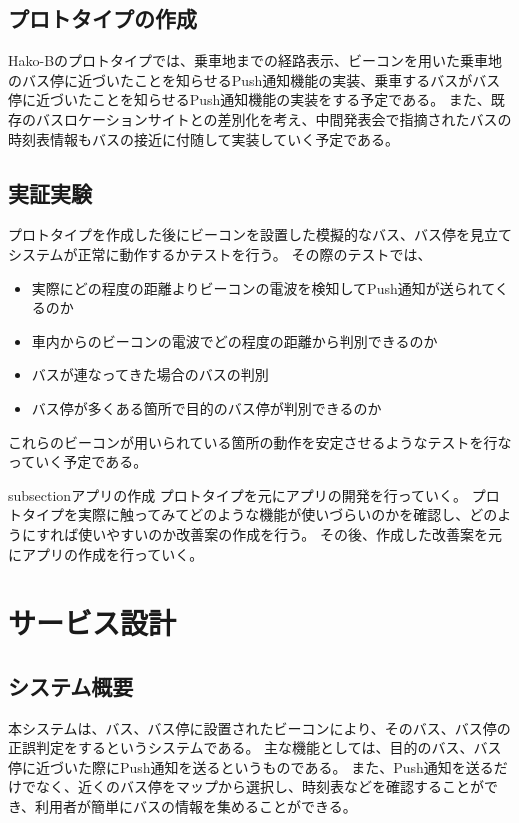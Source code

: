 \documentclass[openany,11pt,papersize]{jsbook}
\begin{document}
\subsection{プロトタイプの作成}
Hako-Bのプロトタイプでは、乗車地までの経路表示、ビーコンを用いた乗車地のバス停に近づいたことを知らせるPush通知機能の実装、乗車するバスがバス停に近づいたことを知らせるPush通知機能の実装をする予定である。
また、既存のバスロケーションサイトとの差別化を考え、中間発表会で指摘されたバスの時刻表情報もバスの接近に付随して実装していく予定である。


\subsection{実証実験}
プロトタイプを作成した後にビーコンを設置した模擬的なバス、バス停を見立てシステムが正常に動作するかテストを行う。
その際のテストでは、
\begin{itemize}

\item 実際にどの程度の距離よりビーコンの電波を検知してPush通知が送られてくるのか
\item 車内からのビーコンの電波でどの程度の距離から判別できるのか
\item バスが連なってきた場合のバスの判別
\item バス停が多くある箇所で目的のバス停が判別できるのか

\end{itemize}
これらのビーコンが用いられている箇所の動作を安定させるようなテストを行なっていく予定である。


subsection{アプリの作成}
プロトタイプを元にアプリの開発を行っていく。
プロトタイプを実際に触ってみてどのような機能が使いづらいのかを確認し、どのようにすれば使いやすいのか改善案の作成を行う。
その後、作成した改善案を元にアプリの作成を行っていく。


\section{サービス設計}

\subsection{システム概要}
本システムは、バス、バス停に設置されたビーコンにより、そのバス、バス停の正誤判定をするというシステムである。
主な機能としては、目的のバス、バス停に近づいた際にPush通知を送るというものである。
また、Push通知を送るだけでなく、近くのバス停をマップから選択し、時刻表などを確認することができ、利用者が簡単にバスの情報を集めることができる。
\end{document}
